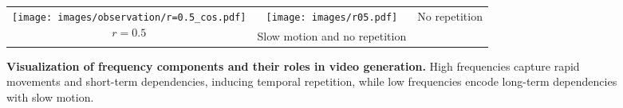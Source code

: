 \begin{figure*}
{\begin{tabular}{c|c|c}
\begin{minipage}{0.83\textwidth}
    \end{minipage}
    \\ \midrule
    \begin{minipage}{0.16\textwidth}
        \centering
        \texttt{[image: images/observation/r=0.5\_cos.pdf]} %
    \end{minipage}
    &
    \begin{minipage}{0.83\textwidth}
        \centering
        \texttt{[image: images/r05.pdf]}
    \end{minipage} &
    \multirow{2}{*}{No repetition} \\
    \begin{minipage}{0.1\textwidth}
    \vspace{-\baselineskip}
    $$
        r = 0.5
    $$
    \end{minipage}
    & 
    \begin{minipage}{0.83\textwidth}
    \centering
    \vspace{0.4\baselineskip}
    Slow motion and no repetition
    \end{minipage} & \\ \bottomrule
    \end{tabular}}
    \caption{\textbf{Visualization of frequency components and their roles in video generation.} High frequencies capture rapid movements and short-term dependencies, inducing temporal repetition, while low frequencies encode long-term dependencies with slow motion.}
    \label{fig:each}
\end{figure*}